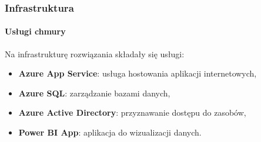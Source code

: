 \documentclass[10pt]{beamer}
\begin{document}
\begin{frame}
	\frametitle{Infrastruktura}
	\framesubtitle{Usługi chmury}
	Na infrastrukturę rozwiązania składały się usługi: 

	\bigskip
	
	\begin{itemize}
		\item \textbf{Azure App Service}: usługa hostowania aplikacji internetowych,
		\item \textbf{Azure SQL}: zarządzanie bazami danych,
		\item \textbf{Azure Active Directory}: przyznawanie dostępu do zasobów,
		\item \textbf{Power BI App}: aplikacja do wizualizacji danych.
	\end{itemize}

	\bigskip


\end{frame}
\end{document}
